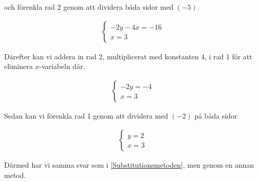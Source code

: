och förenkla rad 2 genom att dividera båda sidor med $(-5)$.

\begin{align}
	\begin{cases}
		-2y-4x=-16 \\
		x = 3
	\end{cases}
\end{align}

Därefter kan vi addera in rad 2, multiplicerat med konstanten $4$, i rad 1 för att eliminera $x$-variabeln där.

\begin{align}
	\begin{cases}
		-2y=-4 \\
		x = 3
	\end{cases}
\end{align}

Sedan kan vi förenkla rad 1 genom att dividera med $(-2)$ på båda sidor

\begin{align}
	\begin{cases}
		y=2 \\
		x = 3
	\end{cases}
\end{align}

Därmed har vi samma svar som i \ref{Substitutionsmetoden}, men genom en annan metod.






































